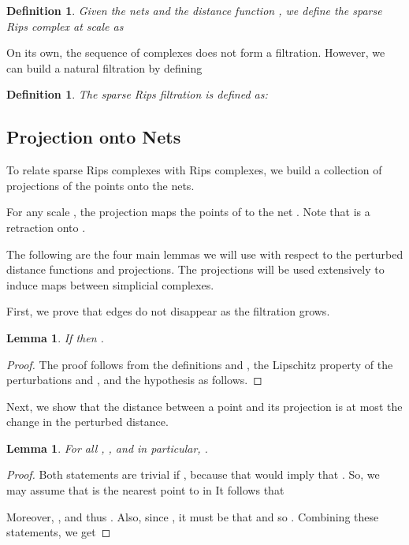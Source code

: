 \documentclass[a4paper]{article}
\newtheorem{definition}[theorem]{Definition}
\newtheorem{lemma}[theorem]{Lemma}
\begin{document}
\begin{definition}
Given the nets  and the distance function , we define the \emph{sparse Rips complex} at scale  as
  
  \end{definition}
  
  On its own, the sequence of complexes  does not form a filtration.
  However, we can build a natural filtration by defining 
  
\begin{definition}
The \emph{sparse Rips filtration} is defined as:
  
\end{definition}

\subsection{Projection onto Nets} \label{sub:projection_onto_nets}
To relate sparse Rips complexes with Rips complexes, we build a collection of projections of the points onto the nets.
  
  For any scale , the projection  maps the points of  to the net .
  Note that  is a retraction onto .
  
  The following are the four main lemmas we will use with respect to the perturbed distance functions and projections.
  The projections will be used extensively to induce maps between simplicial complexes.
  
First, we prove that edges do not disappear as the filtration grows.  
  \begin{lemma}\label{lem:filtration}
    If  then .
  \end{lemma}
  \begin{proof}
    The proof follows from the definitions  and , the Lipschitz property of the perturbations  and , and the hypothesis as follows.
    
  \end{proof}
 
Next, we show that the distance between a point and its projection is at most the change in the perturbed distance.
  \begin{lemma}\label{lem:distance_to_proj} 
    For all , , and in particular, .
  \end{lemma}
  \begin{proof}
    Both statements are trivial if , because that would imply that .
    So, we may assume that  is the nearest point to  in 
    It follows that 

Moreover, , and thus .    
    Also, since , it must be that  and so .
    Combining these statements, we get
    
  \end{proof}
\end{document}
